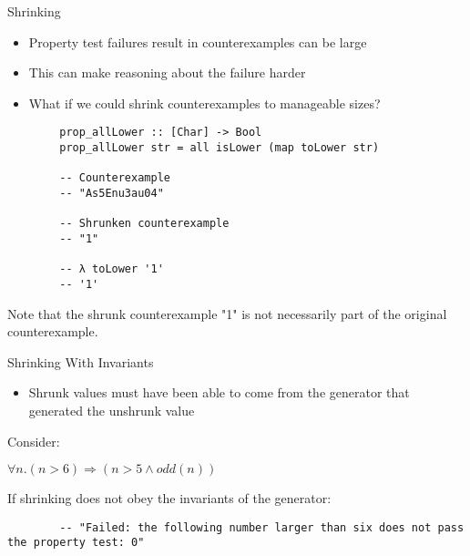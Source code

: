     \begin{frame}[fragile]{Shrinking}
        \begin{itemize}
            \item Property test failures result in counterexamples can be large
            \item This can make reasoning about the failure harder
            \item What if we could shrink counterexamples to manageable sizes?
        \end{itemize} 
        
        \begin{verbatim}
        prop_allLower :: [Char] -> Bool
        prop_allLower str = all isLower (map toLower str)
        
        -- Counterexample
        -- "As5Enu3au04"
        
        -- Shrunken counterexample
        -- "1"
        
        -- λ toLower '1'
        -- '1'
        \end{verbatim}
        
        Note that the shrunk counterexample "1" is not necessarily part of the
        original counterexample.
    \end{frame}
    
    \begin{frame}[fragile]{Shrinking With Invariants}
        \begin{itemize}
            \item Shrunk values must have been able to come from the generator that generated the unshrunk value
        \end{itemize}
        
        Consider:
        
        \(\forall n. (n > 6) \Rightarrow (n > 5 \land odd(n)) \)
       
        If shrinking does not obey the invariants of the generator:
        
        \begin{verbatim}
        -- "Failed: the following number larger than six does not pass the property test: 0" 
        \end{verbatim}
    \end{frame}


